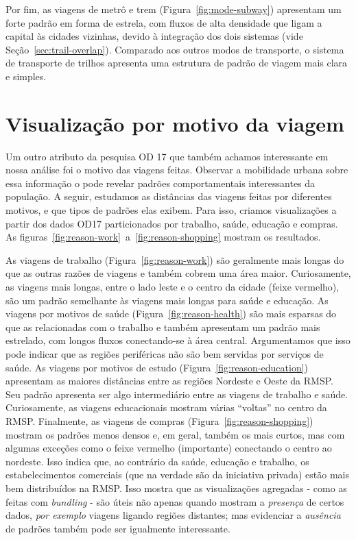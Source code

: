 Por fim, as viagens de metrô e trem (Figura~\ref{fig:mode-subway}) apresentam um
forte padrão em forma de estrela, com fluxos de alta densidade que ligam a
capital às cidades vizinhas, devido à integração dos dois sistemas (vide
Seção~\ref{sec:trail-overlap}). Comparado aos outros modos de transporte, o
sistema de transporte de trilhos apresenta uma estrutura de padrão de viagem
mais clara e simples.

\section{Visualização por motivo da viagem}
\label{sec:dist_reasons}
Um outro atributo da pesquisa OD 17 que também achamos interessante em nossa
análise foi o motivo das viagens feitas. Observar a mobilidade urbana sobre essa
informação o pode revelar padrões comportamentais interessantes da população. A
seguir, estudamos as distâncias das viagens feitas por diferentes motivos, e que
tipos de padrões elas exibem. Para isso, criamos visualizações a partir dos
dados OD17 particionados por trabalho, saúde, educação e compras. As
figuras~\ref{fig:reason-work}~a~\ref{fig:reason-shopping} mostram os resultados.

As viagens de trabalho (Figura~\ref{fig:reason-work}) são geralmente mais longas
do que as outras razões de viagens e também cobrem uma área maior. Curiosamente, as viagens mais longas, entre o
lado leste e o centro da cidade (feixe vermelho), são um padrão semelhante às
viagens mais longas para saúde e educação. As viagens por motivos de saúde
(Figura~\ref{fig:reason-health}) são mais esparsas do que as relacionadas com o
trabalho e também apresentam um padrão mais estrelado, com longos fluxos
conectando-se à área central. Argumentamos que isso pode indicar que as regiões
periféricas não são bem servidas por serviços de saúde. As viagens por motivos
de estudo (Figura~\ref{fig:reason-education}) apresentam as maiores distâncias
entre as regiões Nordeste e Oeste da RMSP. Seu padrão apresenta ser algo
intermediário entre as viagens de trabalho e saúde. Curiosamente, as viagens
educacionais mostram várias ``voltas'' no centro da RMSP. Finalmente, as viagens
de compras (Figura~\ref{fig:reason-shopping}) mostram os padrões menos densos e,
em geral, também os mais curtos, mas com algumas exceções como o feixe vermelho
(importante) conectando o centro ao nordeste. Isso indica que, ao contrário da
saúde, educação e trabalho, os estabelecimentos comerciais (que na verdade são
da iniciativa privada) estão mais bem distribuídos na RMSP. Isso mostra que as
visualizações agregadas - como as feitas com \emph{bundling} - são úteis não
apenas quando mostram a \emph{presença} de certos dados, \emph{por exemplo}
viagens ligando regiões distantes; mas evidenciar a \emph{ausência} de padrões também
pode ser igualmente interessante.

